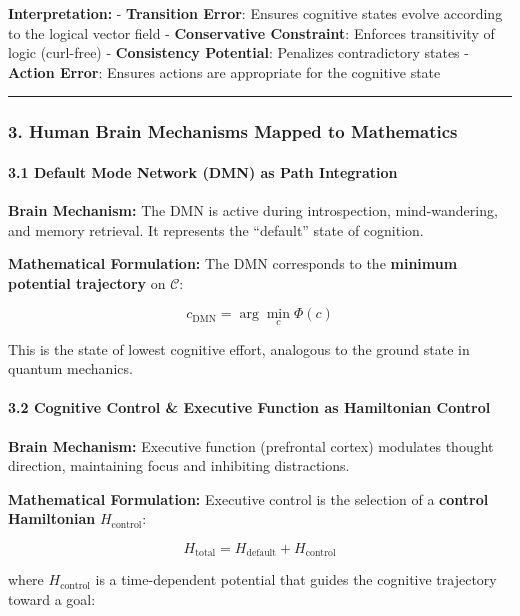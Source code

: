 \documentclass[
  11pt,
  a4paper,
]{article}
\begin{document}
\textbf{Interpretation:} - \textbf{Transition Error}: Ensures cognitive
states evolve according to the logical vector field -
\textbf{Conservative Constraint}: Enforces transitivity of logic
(curl-free) - \textbf{Consistency Potential}: Penalizes contradictory
states - \textbf{Action Error}: Ensures actions are appropriate for the
cognitive state

\begin{center}\rule{0.5\linewidth}{0.5pt}\end{center}

\subsubsection{3. Human Brain Mechanisms Mapped to
Mathematics}\label{human-brain-mechanisms-mapped-to-mathematics}

\paragraph{3.1 Default Mode Network (DMN) as Path
Integration}\label{default-mode-network-dmn-as-path-integration}

\textbf{Brain Mechanism:} The DMN is active during introspection,
mind-wandering, and memory retrieval. It represents the ``default''
state of cognition.

\textbf{Mathematical Formulation:} The DMN corresponds to the
\textbf{minimum potential trajectory} on \(\mathcal{C}\):

\[c_{\text{DMN}} = \arg\min_{c} \Phi(c)\]

This is the state of lowest cognitive effort, analogous to the ground
state in quantum mechanics.

\paragraph{3.2 Cognitive Control \& Executive Function as Hamiltonian
Control}\label{cognitive-control-executive-function-as-hamiltonian-control}

\textbf{Brain Mechanism:} Executive function (prefrontal cortex)
modulates thought direction, maintaining focus and inhibiting
distractions.

\textbf{Mathematical Formulation:} Executive control is the selection of
a \textbf{control Hamiltonian} \(H_{\text{control}}\):

\[H_{\text{total}} = H_{\text{default}} + H_{\text{control}}\]

where \(H_{\text{control}}\) is a time-dependent potential that guides
the cognitive trajectory toward a goal:
\end{document}
